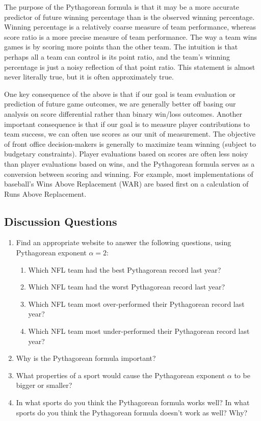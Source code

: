 \documentclass{article}
\begin{document}
    The purpose of the Pythagorean formula is that it may be a more accurate predictor of future winning percentage than is the observed winning percentage. Winning percentage is a relatively coarse measure of team performance, whereas score ratio is a more precise measure of team performance. The way a team wins games is by scoring more points than the other team. The intuition is that perhaps all a team can control is its point ratio, and the team's winning percentage is just a noisy reflection of that point ratio. This statement is almost never literally true, but it is often approximately true.
    
    One key consequence of the above is that if our goal is team evaluation or prediction of future game outcomes, we are generally better off basing our analysis on score differential rather than binary win/loss outcomes. Another important consequence is that if our goal is to measure player contributions to team success, we can often use scores as our unit of measurement. The objective of front office decision-makers is generally to maximize team winning (subject to budgetary constraints). Player evaluations based on scores are often less noisy than player evaluations based on wins, and the Pythagorean formula serves as a conversion between scoring and winning. For example, most implementations of baseball's Wins Above Replacement (WAR) are based first on a calculation of Runs Above Replacement.

    \subsection*{\sc Discussion Questions}
    
      \begin{enumerate}
        \item Find an appropriate website to answer the following questions, using Pythagorean exponent $\alpha = 2$:
        \begin{enumerate}
          \item Which NFL team had the best Pythagorean record last year?
          \item Which NFL team had the worst Pythagorean record last year?
          \item Which NFL team most over-performed their Pythagorean record last year?
          \item Which NFL team most under-performed their Pythagorean record last year?
        \end{enumerate}
        \item Why is the Pythagorean formula important?
        \item What properties of a sport would cause the Pythagorean exponent $\alpha$ to be bigger or smaller?
        \item In what sports do you think the Pythagorean formula works well? In what sports do you think the Pythagorean formula doesn't work as well? Why?
      \end{enumerate}
\end{document}
